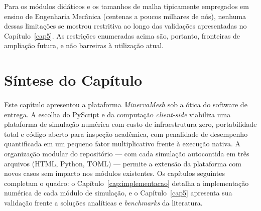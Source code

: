 Para os módulos didáticos e os tamanhos de malha tipicamente empregados em ensino de Engenharia Mecânica (centenas a poucos milhares de nós), nenhuma dessas limitações se mostrou restritiva ao longo das validações apresentadas no Capítulo~\ref{cap5}. As restrições enumeradas acima são, portanto, fronteiras de ampliação futura, e não barreiras à utilização atual.

\section{Síntese do Capítulo}
\label{sec:sintese_plataforma}

\paragraph{}Este capítulo apresentou a plataforma \textit{MinervaMesh} sob a ótica do software de entrega. A escolha do PyScript e da computação \textit{client-side} viabiliza uma plataforma de simulação numérica com custo de infraestrutura zero, portabilidade total e código aberto para inspeção acadêmica, com penalidade de desempenho quantificada em um pequeno fator multiplicativo frente à execução nativa. A organização modular do repositório --- com cada simulação autocontida em três arquivos (HTML, Python, TOML) --- permite a extensão da plataforma com novos casos sem impacto nos módulos existentes. Os capítulos seguintes completam o quadro: o Capítulo~\ref{cap:implementacao} detalha a implementação numérica de cada módulo de simulação, e o Capítulo~\ref{cap5} apresenta sua validação frente a soluções analíticas e \textit{benchmarks} da literatura.
